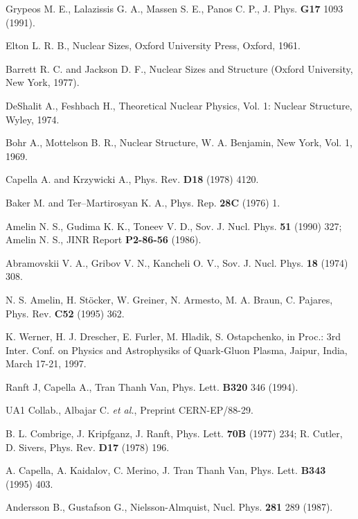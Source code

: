 \begin{thebibliography}{599}

 Grypeos M. E., Lalazissis G. A., Massen S. E., Panos C. P.,
J. Phys. {\bf G17} 1093 (1991).

 Elton L. R. B., Nuclear Sizes, Oxford University Press, 
Oxford, 1961.

 Barrett R. C. and Jackson D. F., Nuclear Sizes and Structure
(Oxford University, New York, 1977).

 DeShalit A., Feshbach H., Theoretical Nuclear Physics, Vol. 1: 
Nuclear Structure, Wyley, 1974.

 Bohr A., Mottelson B. R., Nuclear Structure, W. A. Benjamin, 
New York, Vol. 1, 1969.

 Capella A. and Krzywicki A., Phys. Rev. {\bf D18} 
(1978) 4120. 

 Baker M. and Ter--Martirosyan K. A.,  Phys. Rep.
{\bf 28C} (1976) 1.

  Amelin N. S., Gudima K. K., Toneev V. D.,
  Sov. J. Nucl. Phys. {\bf 51} (1990) 327; 
   Amelin N. S.,  JINR Report {\bf P2-86-56} (1986).

 Abramovskii V. A., Gribov V. N., Kancheli O. V.,
 Sov. J. Nucl. Phys.
{\bf 18} (1974) 308.

 N. S. Amelin, H. St\"ocker, W. Greiner, N. Armesto, M. A. Braun, C. Pajares, 
Phys. Rev. {\bf C52} (1995) 362.

 K. Werner, H. J. Drescher, E. Furler, M. Hladik, S.
Ostapchenko, in Proc.: 3rd Inter. Conf. on Physics and Astrophysiks of 
Quark-Gluon Plasma, Jaipur, India, March 17-21, 1997.
 
 Ranft J, Capella A., Tran Thanh Van, Phys. Lett. {\bf B320} 
346 (1994).

 UA1 Collab., Albajar C. {\it et al.}, Preprint CERN-EP/88-29.

 B. L. Combrige, J. Kripfganz, J. Ranft, Phys. Lett. {\bf 70B} 
(1977) 234; R. Cutler, D. Sivers, Phys. Rev. {\bf D17} (1978) 196. 

 A. Capella, A. Kaidalov, C. Merino,  J. Tran Thanh
Van, Phys. Lett.  {\bf B343} (1995) 403.


 Andersson B., Gustafson G., Nielsson-Almquist, Nucl. 
Phys. {\bf 281} 289 (1987).


\end{thebibliography}
